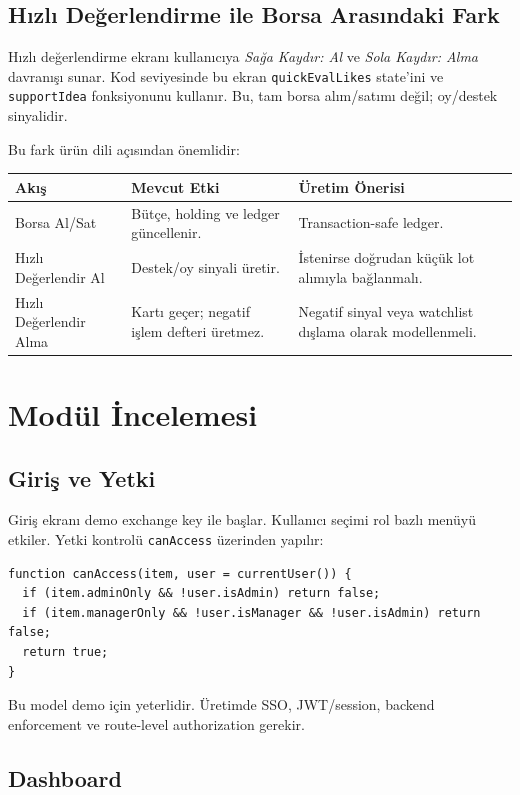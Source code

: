 \documentclass[11pt,a4paper]{article}
\newcommand{\code}[1]{\texttt{#1}}
\begin{document}
\subsection{Hızlı Değerlendirme ile Borsa Arasındaki Fark}

Hızlı değerlendirme ekranı kullanıcıya \textit{Sağa Kaydır: Al} ve \textit{Sola Kaydır: Alma} davranışı sunar. Kod seviyesinde bu ekran \code{quickEvalLikes} state'ini ve \code{supportIdea} fonksiyonunu kullanır. Bu, tam borsa alım/satımı değil; oy/destek sinyalidir.

Bu fark ürün dili açısından önemlidir:

\begin{longtable}{p{}p{}p{}}
\toprule
\textbf{Akış} & \textbf{Mevcut Etki} & \textbf{Üretim Önerisi}\\
\midrule
Borsa Al/Sat & Bütçe, holding ve ledger güncellenir. & Transaction-safe ledger.\\
Hızlı Değerlendir Al & Destek/oy sinyali üretir. & İstenirse doğrudan küçük lot alımıyla bağlanmalı.\\
Hızlı Değerlendir Alma & Kartı geçer; negatif işlem defteri üretmez. & Negatif sinyal veya watchlist dışlama olarak modellenmeli.\\
\bottomrule
\end{longtable}

\section{Modül İncelemesi}

\subsection{Giriş ve Yetki}

Giriş ekranı demo exchange key ile başlar. Kullanıcı seçimi rol bazlı menüyü etkiler. Yetki kontrolü \code{canAccess} üzerinden yapılır:

\begin{lstlisting}
function canAccess(item, user = currentUser()) {
  if (item.adminOnly && !user.isAdmin) return false;
  if (item.managerOnly && !user.isManager && !user.isAdmin) return false;
  return true;
}
\end{lstlisting}

Bu model demo için yeterlidir. Üretimde SSO, JWT/session, backend enforcement ve route-level authorization gerekir.

\subsection{Dashboard}
\end{document}
